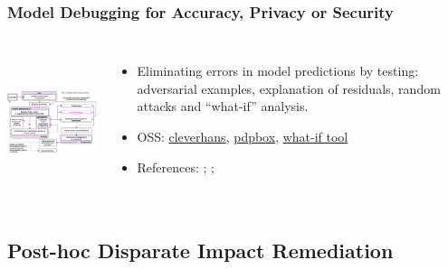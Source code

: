 \documentclass[11pt,
               aspectratio=169,
               hyperref={colorlinks}
               ]{beamer}
\begin{document}
			\begin{frame}
		
				\frametitle{Model Debugging for Accuracy, Privacy or Security}		
			
				\begin{columns}
	
					\centering
					\includegraphics[height=120pt]{img/md.png}
				
					\vspace{-5pt}
					\scriptsize
					{\begin{itemize}
						\item Eliminating errors in model predictions by testing: adversarial examples, explanation of residuals, random attacks and ``what-if'' analysis.
						\item OSS: \href{https://github.com/tensorflow/cleverhans}{cleverhans}, \href{https://github.com/SauceCat/PDPbox}{pdpbox}, \href{https://pair-code.github.io/what-if-tool/index.html}{what-if tool}
						\item References: ; ; 
					\end{itemize}}
					\normalsize
				
				\end{columns}			
			
			\end{frame}
				
		\subsection{Post-hoc Disparate Impact Remediation}
		
\end{document}
